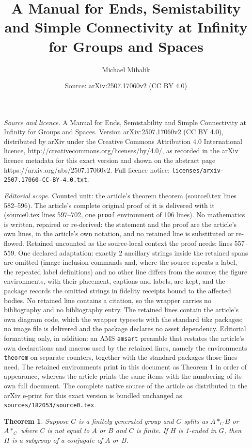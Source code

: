 \documentclass[10pt,a4paper]{amsart}
\title{A Manual for Ends, Semistability and Simple Connectivity at Infinity for Groups and Spaces}
\author{Michael Mihalik}
\date{Source: arXiv:2507.17060v2 (CC BY 4.0)}
\newtheorem{theorem}{Theorem}
\begin{document}
\maketitle

\noindent\emph{Source and licence.} A Manual for Ends, Semistability and Simple Connectivity at Infinity for Groups and Spaces. Version arXiv:2507.17060v2 (CC BY 4.0), distributed by arXiv under the Creative Commons Attribution 4.0 International licence, http://creativecommons.org/licenses/by/4.0/, as recorded in the arXiv licence metadata for this exact version and shown on the abstract page https://arxiv.org/abs/2507.17060v2. Full licence notice: \texttt{licenses/arxiv-2507.17060-CC-BY-4.0.txt}.\par\smallskip

\noindent\textit{Editorial scope.} Counted unit: the article's theorem theorem (source0.tex lines 582--596). The article's complete original proof of it is delivered with it (source0.tex lines 597--702, one \texttt{proof} environment of 106 lines). No mathematics is written, repaired or re-derived: the statement and the proof are the article's own lines, in the article's own notation, and no retained line is substituted or re-flowed.  Retained uncounted as the source-local context the proof needs: lines 557--559.  One declared adaptation: exactly 2 ancillary strings inside the retained spans are omitted (image-inclusion commands and, where the source repeats a label, the repeated label definitions) and no other line differs from the source; the figure environments, with their placement, captions and labels, are kept, and the package records the omitted strings in fidelity receipts bound to the affected bodies.  No retained line contains a citation, so the wrapper carries no bibliography and no bibliography entry.  The retained lines contain the article's own diagram code, which the wrapper typesets with the standard tikz packages; no image file is delivered and the package declares no asset dependency.  Editorial formatting only, in addition: an AMS \texttt{amsart} preamble that restates the article's own declarations and macros used by the retained lines, namely the environments \texttt{theorem} on separate counters, together with the standard packages those lines need.  The retained environments print in this document as Theorem 1 in order of appearance, whereas the article prints the same items with the numbering of its own full document.  The complete native source of the article as distributed in the arXiv e-print for this exact version is bundled unchanged as \texttt{sources/182053/source0.tex}.
\begin{theorem} \label{OneEndSplit} 
Suppose $G$ is a finitely generated group and $G$ splits as $A\ast_C B$ or $A\ast_C$ where $C$ is not equal to $A$ or $B$ and $C$ is finite. If $H$ is 1-ended in $G$, then $H$ is a subgroup of a conjugate of $A$ or $B$. 
\end{theorem}
\end{document}
